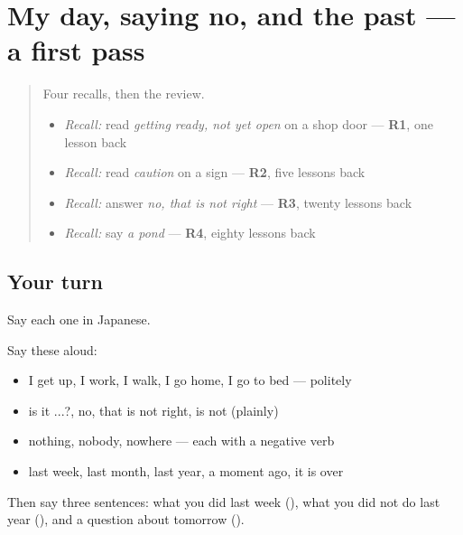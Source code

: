 \section[(dialogue)]{My day, saying no, and the past — a first pass}

\label{lesson:JA-R142-first-pass-my-day-no-and-the-past}



\begin{quote}
Four recalls, then the review.

\begin{itemize}
\raggedright
  \item \emph{Recall:} read \emph{getting ready, not yet open} on a shop door — \textbf{R1}, one lesson back
  \item \emph{Recall:} read \emph{caution} on a sign — \textbf{R2}, five lessons back
  \item \emph{Recall:} answer \emph{no, that is not right} — \textbf{R3}, twenty lessons back
  \item \emph{Recall:} say \emph{a pond} — \textbf{R4}, eighty lessons back
\end{itemize}
\end{quote}

\subsection*{Your turn}
Say each one in Japanese.

Say these aloud:

\begin{itemize}
\raggedright
  \item I get up, I work, I walk, I go home, I go to bed — politely
  \item is it ...?, no, that is not right, is not (plainly)
  \item nothing, nobody, nowhere — each with a negative verb
  \item last week, last month, last year, a moment ago, it is over
\end{itemize}

Then say three sentences: what you did last week (\textbf{}), what you did not do last year (\textbf{}), and a question about tomorrow (\textbf{}).

